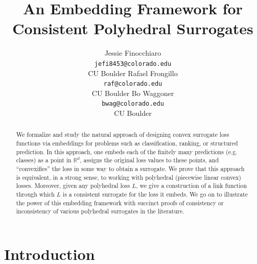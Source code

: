 \documentclass[12pt]{article}
\title{An Embedding Framework for Consistent Polyhedral Surrogates}
\author{%
 Jessie Finocchiaro \\
 \texttt{jefi8453@colorado.edu}\\
 CU Boulder
 \And
 Rafael Frongillo\\
 \texttt{raf@colorado.edu}\\
 CU Boulder
 \And
 Bo Waggoner\\
 \texttt{bwag@colorado.edu}\\
 CU Boulder
}
\newcommand{\reals}{\mathbb{R}}
\begin{document}
\maketitle

\begin{abstract}
We formalize and study the natural approach of designing convex surrogate loss functions via embeddings for problems such as classification, ranking, or structured prediction. 
In this approach, one embeds each of the finitely many predictions (e.g. classes) as a point in $\reals^d$, assigns the original loss values to these points, and ``convexifies'' the loss in some way to obtain a surrogate.
We prove that this approach is equivalent, in a strong sense, to working with polyhedral (piecewise linear convex) losses.
Moreover, given any polyhedral loss $L$, we give a construction of a link function through which $L$ is a consistent surrogate for the loss it embeds.
We go on to illustrate the power of this embedding framework with succinct proofs of consistency or inconsistency of various polyhedral surrogates in the literature.
\end{abstract}


\section{Introduction}\label{sec:intro}
\end{document}
